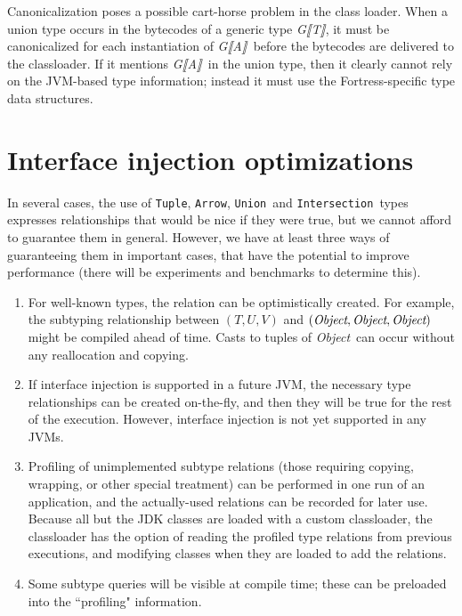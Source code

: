 \documentclass[11pt]{article}
\def\LOBR{\mbox{\fontspec{Code2000}⟦}}
\def\ROBR{\mbox{\fontspec{Code2000}⟧}}
\newcommand{\fit}[1]{\mbox{\it #1}}
\newcommand{\jvm}[1]{{\tt #1}}
\def\OBJ{\fit{Object}}
\begin{document}
Canonicalization poses a possible cart-horse problem in the class loader.  When a union type occurs in the bytecodes of a generic type \fit{G\LOBR T\ROBR}, it must be canonicalized for each instantiation of \fit{G\LOBR A\ROBR}\ before the bytecodes are delivered to the classloader.  If it mentions \fit{G\LOBR A\ROBR}\ in the union type, then it clearly cannot rely on the JVM-based type information; instead it must use the Fortress-specific type data structures.

\section{Interface injection optimizations}

In several cases, the use of \jvm{Tuple}, \jvm{Arrow}, \jvm{Union}\ and \jvm{Intersection}\ types expresses relationships that would be nice if they were true, but we cannot afford to guarantee them in general.  However, we have at least three ways of guaranteeing them in important cases, that have the potential to improve performance (there will be experiments and benchmarks to determine this).

\begin{enumerate}
\item For well-known types, the relation can be optimistically created.  For example, the subtyping relationship between $(T,U,V)$ and $(\OBJ, \OBJ, \OBJ)$ might be compiled ahead of time.  Casts to tuples of \OBJ\ can occur without any reallocation and copying.
\item If interface injection is supported in a future JVM, the necessary type relationships can be created on-the-fly, and then they will be true for the rest of the execution.  However, interface injection is not yet supported in any JVMs.
\item Profiling of unimplemented subtype relations (those requiring copying, wrapping, or other special treatment) can be performed in one run of an application, and the actually-used relations can be recorded for later use.  Because all but the JDK classes are loaded with a custom classloader, the classloader has the option of reading the profiled type relations from previous executions, and modifying classes when they are loaded to add the relations.
\item Some subtype queries will be visible at compile time; these can be preloaded into the ``profiling" information.
\end{enumerate}
\end{document}
